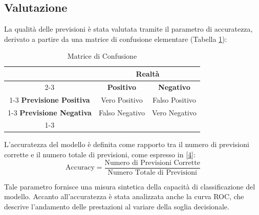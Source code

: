\subsection{Valutazione}
La qualità delle previsioni è stata valutata tramite il parametro di accuratezza, derivato a partire da una matrice di confusione elementare (Tabella \ref{tab:matrice-confusione}):

\begin{table}[H]
\centering
\begin{tabular}{|c|c|c|}
\hline
\multirow{2}{*}{} & \multicolumn{2}{c|}{\cellcolor{gray!20}\textbf{Realtà}} \\ \cline{2-3}
 & \cellcolor{gray!20}\textbf{Positivo} & \cellcolor{gray!20}\textbf{Negativo} \\ \cline{1-3}
\cellcolor{gray!20}\textbf{Previsione Positiva} & \cellcolor{green!20}Vero Positivo & \cellcolor{red!20}Falso Positivo \\ \cline{1-3}
\cellcolor{gray!20}\textbf{Previsione Negativa} & \cellcolor{red!20}Falso Negativo & \cellcolor{green!20}Vero Negativo \\ \cline{1-3}
\end{tabular}
\caption{Matrice di Confusione}
\label{tab:matrice-confusione}
\end{table}

\vspace{+1truecm}

L'accuratezza del modello è definita come rapporto tra il numero di previsioni corrette e il numero totale di previsioni, come espresso in \eqref{4}:
\begin{equation}
\text{Accuracy} = \frac{\text{Numero di Previsioni Corrette}}{\text{Numero Totale di Previsioni}}
\label{4}
\end{equation} 
\newline

Tale parametro fornisce una misura sintetica della capacità di classificazione del modello.
\newline 
Accanto all'accuratezza è stata analizzata anche la curva ROC, che descrive l'andamento delle prestazioni al variare della soglia decisionale.